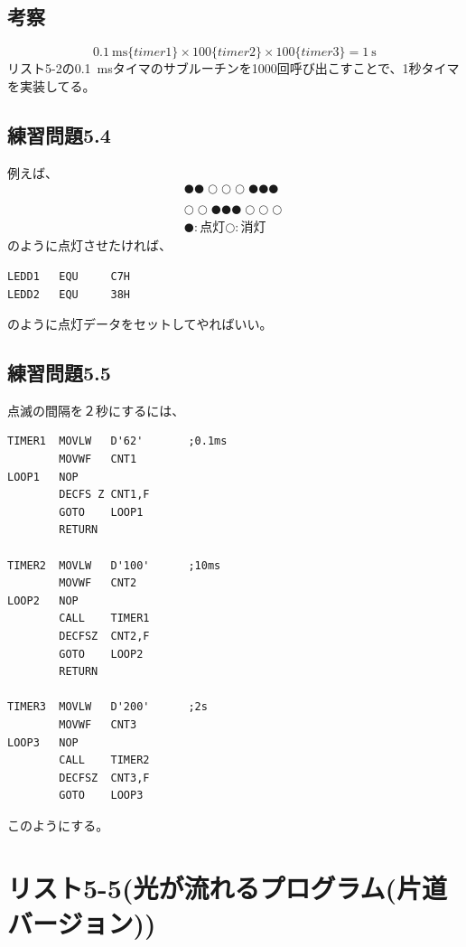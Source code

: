 \documentclass[a4paper,12pt]{ujarticle}
\begin{document}
   \subsection{考察}
    \[
    \SI{0.1}{\milli\second}\{timer1\} \times 100\{timer2\} \times 100\{timer3\}  = \SI{1}{\second}
    \]
    リスト5-2の\SI{0.1}{\milli\second}タイマのサブルーチンを1000回呼び出こすことで、1秒タイマを実装してる。
    \clearpage
  \subsection{練習問題5.4}
  例えば、
  \begin{eqnarray*}
    ●●○○○●●● \\
    \\
    ○○●●●○○○ \\
    ●:点灯○:消灯
  \end{eqnarray*}
  のように点灯させたければ、
  \begin{lstlisting}[basicstyle=\ttfamily\footnotesize, frame=single]
LEDD1   EQU     C7H
LEDD2   EQU     38H
  \end{lstlisting}
  のように点灯データをセットしてやればいい。
  \subsection{練習問題5.5}
  点滅の間隔を２秒にするには、
  \begin{lstlisting}[basicstyle=\ttfamily\footnotesize, frame=single]
TIMER1  MOVLW   D'62'       ;0.1ms
        MOVWF   CNT1
LOOP1   NOP
        DECFS Z CNT1,F
        GOTO    LOOP1
        RETURN

TIMER2  MOVLW   D'100'      ;10ms
        MOVWF   CNT2
LOOP2   NOP
        CALL    TIMER1
        DECFSZ  CNT2,F
        GOTO    LOOP2
        RETURN

TIMER3  MOVLW   D'200'      ;2s
        MOVWF   CNT3
LOOP3   NOP
        CALL    TIMER2
        DECFSZ  CNT3,F
        GOTO    LOOP3
  \end{lstlisting}
  このようにする。
 \section{リスト5-5(光が流れるプログラム(片道バージョン))}
\end{document}
